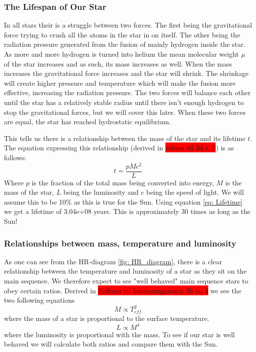 \documentclass[reprint,english,notitlepage]{revtex4-2}
\begin{document}
\subsubsection*{The Lifespan of Our Star}
In all stars their is a struggle between two forces. The first being the gravitational force trying to crush all the atoms in the star in on itself. The other being the radiation pressure generated from the fusion of mainly hydrogen inside the star. As more and more hydrogen is turned into helium the mean molecular weight $ μ $ of the star increases and as such, its mass increases as well. When the mass increases the gravitational force increases and the star will shrink. The shrinkage will create higher pressure and temperature which will make the fusion more effective, increasing the radiation pressure. The two forces will balance each other until the star has a relatively stable radius until there isn't enough hydrogen to stop the gravitational forces, but we will cover this later. When these two forces are equal, the star has reached hydrostatic equilibrium. 

This tells us there is a relationship between the mass of the star and its lifetime $ t $. The equation expressing this relationship (derived in \colorbox{red}{referer til 3d s, 7}) is as follows: 
\begin{equation} \label{eq: Lifetime}
  t = \frac{pMc^{2}}{L}
\end{equation}
Where $ p $ is the fraction of the total mass being converted into energy, $ M $ is the mass of the star, $ L $ being the luminosity and $ c $ being the speed of light. We will assume this to be 10\% as this is true for the Sun. Using equation \ref{eq: Lifetime} we get a lifetime of 3.04e+08 years. This is approximately 30 times as long as the Sun!

\subsubsection*{Relationships between mass, temperature and luminosity}
As one can see from the HR-diagram \ref{fig: HR_diagram}, there is a clear relationship between the temperature and luminosity of a star as they sit on the main sequence. We therefore expect to see  "well behaved" main sequence stars to obey certain ratios. Derived in \colorbox{red}{Refferer til forelesningsnotat 3b eq 4} we see the two following equations
\begin{equation}\label{eq: T M ratio}
  M ∝ T^{2}_{eff}
\end{equation}
where the mass of a star is proportional to the surface temperature. 
\begin{equation}\label{eq: M L ratio}
  L ∝ M^{4}
\end{equation}
where the luminosity is proportional with the mass. To see if our star is well behaved we will calculate both ratios and compare them with the Sun. 
\end{document}
